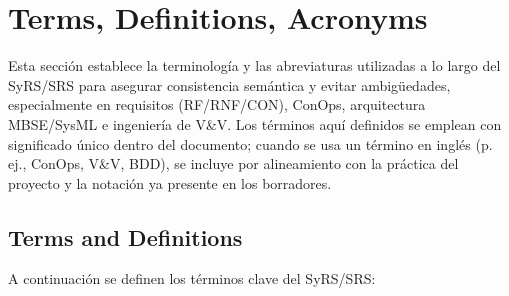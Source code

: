 
\section{Terms, Definitions, Acronyms}\label{sec:terms}

Esta sección establece la terminología y las abreviaturas utilizadas a lo largo del SyRS/\allowbreak SRS para asegurar consistencia semántica y evitar ambigüedades, especialmente en requisitos (RF/\allowbreak RNF/\allowbreak CON), ConOps, arquitectura MBSE/\allowbreak SysML e ingeniería de V\&V. \cite{omg_sysml_mbse, nasa_cm}
Los términos aquí definidos se emplean con significado único dentro del documento; cuando se usa un término en inglés (p. ej., ConOps, V\&V, BDD), se incluye por alineamiento con la práctica del proyecto y la notación ya presente en los borradores. \cite{omg_sysml_mbse, nasa_cm, segoldmine_ppi}

\subsection{Terms and Definitions}

A continuación se definen los términos clave del SyRS/SRS:


